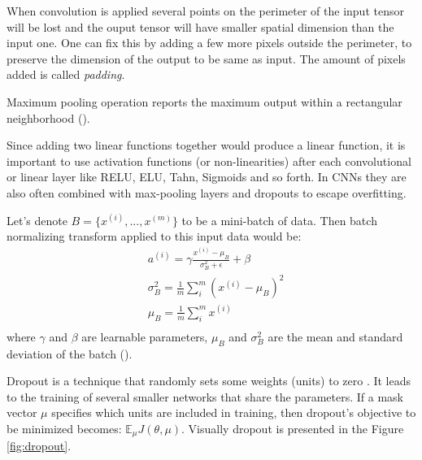 \begin{definition}[Padding]
	When convolution is applied several points on the perimeter of the input tensor will be lost and the ouput tensor will have smaller spatial dimension than the input one. One can fix this by adding a few more pixels outside the perimeter, to preserve the dimension of the output to be same as input. The amount of pixels added is called \textit{padding}. 
\end{definition}

\begin{definition}
	Maximum pooling operation reports the maximum output within a rectangular neighborhood (\cite{Goodfellow_2016}).
\end{definition}


Since adding two linear functions together would produce a linear function, it is important to use activation functions (or non-linearities) after each convolutional or linear layer like RELU, ELU, Tahn, Sigmoids and so forth. In CNNs they are also often combined with max-pooling layers and dropouts to escape overfitting. 

\begin{definition}
	Let's denote $B = \{x^{(i)}, ..., x^{(m)}\}$ to be a mini-batch of data. Then batch normalizing transform applied to this input data would be:
	\begin{equation}
		\begin{split}
		& a^{(i)} = \gamma \frac{x^{(i)} - \mu_B}{\sigma^2_B + \epsilon} + \beta \\
		& \sigma^2_B = \frac{1}{m} \sum_i^m (x^{(i)} - \mu_B)^2 \\
		& \mu_B = \frac{1}{m} \sum_i^m x^{(i)} \\
		\end{split}
	\end{equation}
	where $\gamma$ and $\beta$ are learnable parameters, $\mu_B$ and $\sigma^2_B$ are the mean and standard deviation of the batch (\cite{Ioffe_2015}).
\end{definition}

\begin{definition}
	Dropout is a technique that randomly sets some weights (units) to zero \cite{Srivastava_2014}. It leads to the training of several smaller networks that share the parameters. If a mask vector $\mu$ specifies which units are included in training, then dropout's objective to be minimized becomes: $\mathbb{E}_\mu J(\theta, \mu)$. Visually dropout is presented in the Figure \ref{fig:dropout}.
\end{definition}

